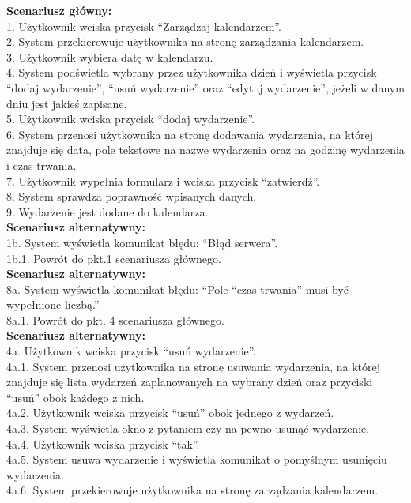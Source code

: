 \begin{enumerate}[label=(\Roman*)]
\textbf{Scenariusz główny:}\\
1. Użytkownik wciska przycisk “Zarządzaj kalendarzem”.\\
2. System przekierowuje użytkownika na stronę zarządzania kalendarzem.\\
3. Użytkownik wybiera datę w kalendarzu.\\
4. System podświetla wybrany przez użytkownika dzień i wyświetla przycisk “dodaj
wydarzenie”, “usuń wydarzenie” oraz “edytuj wydarzenie”, jeżeli w danym dniu jest
jakieś zapisane.\\
5. Użytkownik wciska przycisk “dodaj wydarzenie”.\\
6. System przenosi użytkownika na stronę dodawania wydarzenia, na której znajduje się
data, pole tekstowe na nazwe wydarzenia oraz na godzinę wydarzenia i czas trwania.\\
7. Użytkownik wypełnia formularz i wciska przycisk “zatwierdź”.\\
8. System sprawdza poprawność wpisanych danych.\\
9. Wydarzenie jest dodane do kalendarza.\\
\textbf{Scenariusz alternatywny:}\\
1b. System wyświetla komunikat błędu: “Błąd serwera”.\\
1b.1. Powrót do pkt.1 scenariusza głównego.\\
\textbf{Scenariusz alternatywny:}\\
8a. System wyświetla komunikat błędu: “Pole “czas trwania” musi być wypełnione liczbą.”\\
8a.1. Powrót do pkt. 4 scenariusza głównego.\\
\textbf{Scenariusz alternatywny:}\\
4a. Użytkownik wciska przycisk “usuń wydarzenie”.\\
4a.1. System przenosi użytkownika na stronę usuwania wydarzenia, na której znajduje się
lista wydarzeń zaplanowanych na wybrany dzień oraz przyciski “usuń” obok każdego z nich.\\
4a.2. Użytkownik wciska przycisk “usuń” obok jednego z wydarzeń.\\
4a.3. System wyświetla okno z pytaniem czy na pewno usunąć wydarzenie.\\
4a.4. Użytkownik wciska przycisk “tak”.\\
4a.5. System usuwa wydarzenie i wyświetla komunikat o pomyślnym usunięciu wydarzenia.\\
4a.6. System przekierowuje użytkownika na stronę zarządzania kalendarzem.\\

\end{enumerate}
